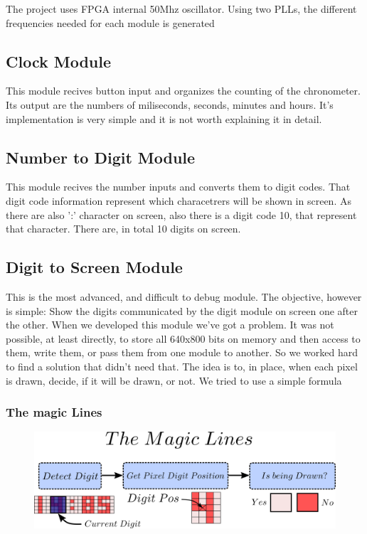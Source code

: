 The project uses FPGA internal 50Mhz oscillator. Using two PLLs, the different frequencies needed for each module is generated

\subsection*{Clock Module}

This module recives button input and organizes the counting of the chronometer.
Its output are the numbers of miliseconds, seconds, minutes and hours.
It's implementation is very simple and it is not worth explaining it in detail.

\subsection*{Number to Digit Module}

This module recives the number inputs and converts them to digit codes. That digit code information represent which characetrers will be shown in screen. As there are also ':' character on screen, also there is a digit code 10, that represent that character.
There are, in total 10 digits on screen.

\subsection*{Digit to Screen Module}
This is the most advanced, and difficult to debug module. The objective, however is simple: Show the digits communicated by the digit module on screen one after the other.
When we developed this module we've got a problem. It was not possible, at least directly, to store all 640x800 bits on memory and then access to them, write them, or pass them from one module to another. So we worked hard to find a solution that didn't need that.
The idea is to, in place, when each pixel is drawn, decide, if it will be drawn, or not. We tried to use a simple formula 

\subsubsection*{The magic Lines}
\begin{figure}[htbp]
    \begin{center}
    \includegraphics[scale=0.8]{dibujos/digitpng.png}
    
    \end{center}
    
    \label{fig:Magic}
    \end{figure}

